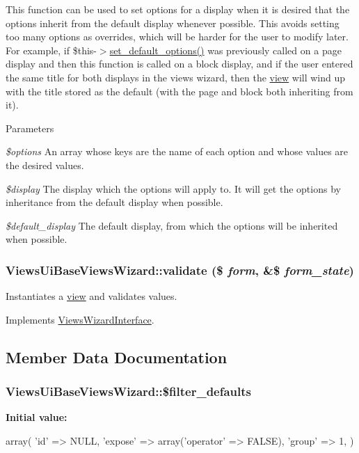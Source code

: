 This function can be used to set options for a display when it is desired that the options inherit from the default display whenever possible. This avoids setting too many options as overrides, which will be harder for the user to modify later. For example, if \$this-\/$>$\hyperlink{classViewsUiBaseViewsWizard_acbcdfdd0fd778fc37844d80348b4fe5f}{set\_\-default\_\-options()} was previously called on a page display and then this function is called on a block display, and if the user entered the same title for both displays in the views wizard, then the \hyperlink{classview}{view} will wind up with the title stored as the default (with the page and block both inheriting from it).


\begin{DoxyParams}{Parameters}
\item[{\em \$options}]An array whose keys are the name of each option and whose values are the desired values. \item[{\em \$display}]The display which the options will apply to. It will get the options by inheritance from the default display when possible. \item[{\em \$default\_\-display}]The default display, from which the options will be inherited when possible. \end{DoxyParams}
\hypertarget{classViewsUiBaseViewsWizard_a894ab06673721a26809f0a662241641b}{
\subsubsection[{validate}]{\setlength{\rightskip}{0pt plus 5cm}ViewsUiBaseViewsWizard::validate (\$ {\em form}, \/  \&\$ {\em form\_\-state})}}
\label{classViewsUiBaseViewsWizard_a894ab06673721a26809f0a662241641b}
Instantiates a \hyperlink{classview}{view} and validates values. 

Implements \hyperlink{interfaceViewsWizardInterface_af5be7d965ec92b27da1eb1a01f5bfc61}{ViewsWizardInterface}.

\subsection{Member Data Documentation}
\hypertarget{classViewsUiBaseViewsWizard_ae8ccdab1c23f4b5f9d63c649e792ca90}{
\subsubsection[{\$filter\_\-defaults}]{\setlength{\rightskip}{0pt plus 5cm}ViewsUiBaseViewsWizard::\$filter\_\-defaults}}
\label{classViewsUiBaseViewsWizard_ae8ccdab1c23f4b5f9d63c649e792ca90}
{\bfseries Initial value:}
\begin{DoxyCode}
 array(
    'id' => NULL,
    'expose' => array('operator' => FALSE),
    'group' => 1,
  )
\end{DoxyCode}


